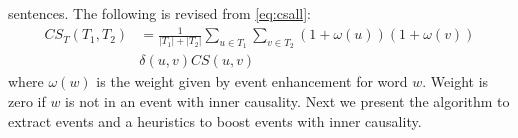 sentences. The following is revised from \eqref{eq:csall}:
\begin{align}
CS_T(T_1,T_2)&=\frac{1}{|T_1|+|T_2|}\sum_{u \in T_1}\sum_{v \in T_2}
(1+ \omega(u))(1+ \omega(v))   \nonumber \\
& \delta(u, v) CS(u, v)
\label{eq:csevent}
\end{align}
where $\omega(w)$ is the weight given by event enhancement for word
$w$. Weight is zero if $w$ is not in an event with inner causality.
Next we present the algorithm to extract events and a heuristics to
boost events with inner causality.

